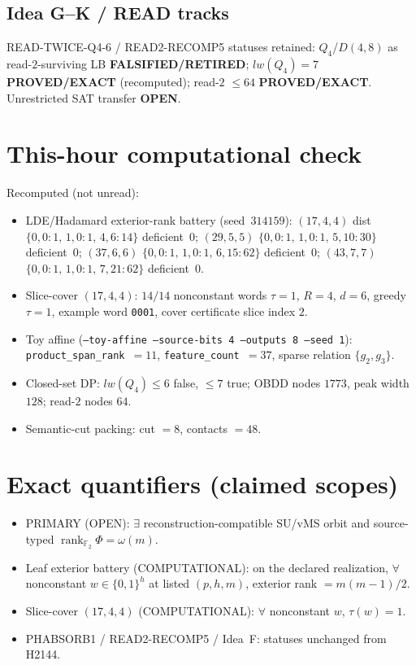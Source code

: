 \documentclass[11pt]{article}
\begin{document}
\subsection*{Idea G--K / READ tracks}
READ-TWICE-Q4-6 / READ2-RECOMP5 statuses retained: $Q_4$/$D(4,8)$ as read-$2$-surviving LB
\textbf{FALSIFIED/RETIRED}; $lw(Q_4)=7$ \textbf{PROVED/EXACT} (recomputed); read-$2$ $\le64$
\textbf{PROVED/EXACT}. Unrestricted SAT transfer \textbf{OPEN}.

\section*{This-hour computational check}
Recomputed (not unread):
\begin{itemize}
\item LDE/Hadamard exterior-rank battery (seed~$314159$):
  $(17,4,4)$ dist $\{0,0{:}1,\,1,0{:}1,\,4,6{:}14\}$ deficient~$0$;
  $(29,5,5)$ $\{0,0{:}1,\,1,0{:}1,\,5,10{:}30\}$ deficient~$0$;
  $(37,6,6)$ $\{0,0{:}1,\,1,0{:}1,\,6,15{:}62\}$ deficient~$0$;
  $(43,7,7)$ $\{0,0{:}1,\,1,0{:}1,\,7,21{:}62\}$ deficient~$0$.
\item Slice-cover $(17,4,4)$: $14/14$ nonconstant words $\tau{=}1$, $R{=}4$, $d{=}6$,
  greedy $\tau{=}1$, example word \texttt{0001}, cover certificate slice index $2$.
\item Toy affine (\texttt{--toy-affine --source-bits 4 --outputs 8 --seed 1}):
  \texttt{product\_span\_rank}~$=11$, \texttt{feature\_count}~$=37$, sparse relation $\{g_2,g_3\}$.
\item Closed-set DP: $lw(Q_4)\le6$ false, $\le7$ true; OBDD nodes $1773$, peak width $128$;
  read-$2$ nodes $64$.
\item Semantic-cut packing: cut $=8$, contacts $=48$.
\end{itemize}

\section*{Exact quantifiers (claimed scopes)}
\begin{itemize}
\item PRIMARY (OPEN): $\exists$ reconstruction-compatible SU/vMS orbit and source-typed
  $\operatorname{rank}_{\mathbb F_2}\Phi=\omega(m)$.
\item Leaf exterior battery (COMPUTATIONAL): on the declared realization, $\forall$ nonconstant
  $w\in\{0,1\}^h$ at listed $(p,h,m)$, exterior rank $=m(m-1)/2$.
\item Slice-cover $(17,4,4)$ (COMPUTATIONAL): $\forall$ nonconstant $w$, $\tau(w)=1$.
\item PHABSORB1 / READ2-RECOMP5 / Idea~F: statuses unchanged from H2144.
\end{itemize}
\end{document}
